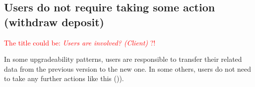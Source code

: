 
\subsection{Users do not require taking some action (withdraw deposit)}
\textcolor{red}{The title could be: \textit{Users are involved? (Client)} ?!}

In some upgradeability patterns, users are responsible to transfer their related data from the previous version to the new one. In some others, users do not need to take any further actions like this (\checkmark)). 

 


